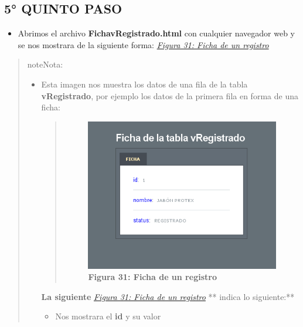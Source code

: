 \documentclass[letterpaper,11pt,spanish]{sphinxmanual}
\begin{document}
\subsection{5° QUINTO PASO}
\label{_templates/Contenido6/Parte5:quinto-paso}\begin{itemize}
\item {} 
Abrimos el archivo \textbf{FichavRegistrado.html} con cualquier navegador web y se nos mostrara de la siguiente forma: {\hyperref[_templates/Contenido6/Parte5:figura47]{\emph{Figura 31: Ficha de un registro}}}

\end{itemize}
\begin{quote}

\begin{notice}{note}{Nota:}\begin{itemize}
\item {} 
Esta imagen nos muestra los datos de una fila de la tabla \textbf{vRegistrado}, por ejemplo los datos de la primera fila en forma de una ficha:
\begin{quote}
\begin{figure}[htbp]
\centering
\capstart

\includegraphics{fichavRegistrado.png}
\caption{\textbf{Figura 31: Ficha de un registro}}\label{_templates/Contenido6/Parte5:figura47}\end{figure}
\end{quote}

\textbf{La siguiente} {\hyperref[_templates/Contenido6/Parte5:figura47]{\emph{Figura 31: Ficha de un registro}}} ** indica lo siguiente:**
\begin{itemize}
\item {} 
Nos mostrara el \textbf{id} y su valor


\end{itemize}
\end{itemize}
\end{notice}
\end{quote}
\end{document}
